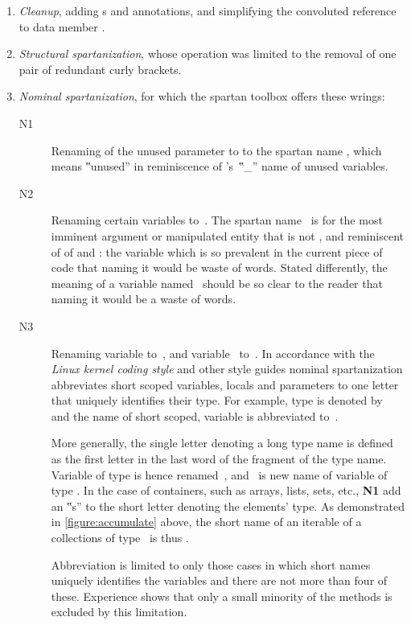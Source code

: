 \begin{enumerate}
  \item \emph{Cleanup}, adding s and  annotations,
      and simplifying the convoluted reference to data member .
    \item \emph{Structural spartanization}, whose operation was limited to the
      removal of one pair of redundant curly brackets.
    \item \emph{Nominal spartanization}, for which the spartan toolbox offers these
      wrings:
      \begin{description}
        \item[N1] Renaming of the unused
      parameter  to  to the spartan name
      \cc{\_\_}, which means ‟unused” in reminiscence of \Prolog's~‟\cc\_”
      name of unused variables.
    \item[N2] Renaming certain variables to~. The
      spartan name~ is for the most imminent argument or manipulated
      entity that is not , and reminiscent of  of \ML and
        \HyperTalk:
        the variable which is so prevalent in the current piece of code that
        naming it would be waste of words. Stated differently, the
        meaning of a variable named~ should be so clear to the reader that
        naming it would be a waste of words.

      \item[N3] Renaming variable  to~, and variable~
        to~. In accordance with the \emph{Linux kernel coding style}%
        and other style guides nominal spartanization abbreviates short scoped
        variables, locals and parameters to one letter that uniquely identifies
        their type. For example, type  is denoted by~ and the
        name of short scoped, variable  is abbreviated to~.

        More generally, the single letter denoting a long type name is defined
        as the first letter in the last word of the fragment of the type name.
        Variable  of type  is hence renamed~,
        and~ is new name of variable  of type
        . In the case of containers, such as arrays,
        lists, sets, etc., \textbf{N1} add an ‟s” to the short letter
        denoting the elements' type. As demonstrated in
        \cref{figure:accumulate} above, the short name of an iterable of a
        collections of type~ is thus .

        Abbreviation is limited to only those cases in which short names
        uniquely identifies the variables and there are not more than four of
        these. Experience shows that only a small minority of the methods is
        excluded by this limitation.
\end{description}
  \end{enumerate}

